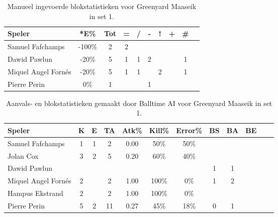 \begin{table}[ht!]
    \centering
    \scriptsize
    \begin{tabular}{|l|c|c|c|c|c|c|c|c|c|} \hline
        \textbf{Speler} & *E\% & Tot & = & / & - & ! & + & \# \\ \hline
        Samuel Fafchamps & -100\% & 2 & 2 &  &  &  &  & \\ 
        Dawid Pawlun & -20\% & 5 & 1 & 1 & 2 & & & 1 \\ 
        Miquel Angel Fornés & -20\% & 5 & 1 & 1 &  & 2 & & 1 \\
        Pierre Perin & 0\% & 1 &  &  & 1 &  &  &\\ \hline
    \end{tabular}
    \caption[Manueel ingevoerde blokstatistieken voor Greenyard Maaseik in set 1]{\label{tab:PL3BlockMaaseikMan1}Manueel ingevoerde blokstatistieken voor Greenyard Maaseik in set 1.}
\end{table}

\begin{table}[ht!]
  \centering
  \scriptsize
    \begin{tabular}{|l|c|c|c|c|c|c|c|c|c|c|c|} \hline
    \textbf{Speler} & K & E & TA & Atk\% & Kill\% & Error\% & BS & BA & BE \\ \hline
    Samuel Fafchamps & 1 & 1 & 2 & 0.00 & 50\% & 50\% &  &  &  \\
    Jolan Cox & 3 & 2 & 5 & 0.20 & 60\% & 40\% &   &  &  \\
    Dawid Pawlun &   &   &   &   &   &   & 1 & 1 & \\
    Miquel Angel Fornés & 2 &  & 2 & 1.00 & 100\% & 0\% & 1 & 2 & \\
    Hampus Ekstrand & 2 &  & 2 & 1.00 & 100\% & 0\% &  & & \\
    Pierre Perin & 5 & 2 & 11 & 0.27 & 45\% & 18\% & 0 & 1 & \\ \hline
  \end{tabular}
  \caption[Aanvals- en blokstatistieken gemaakt door Balltime AI voor Greenyard Maaseik in set 1]{\label{tab:PL3AttBlockMaaseikAI1}Aanvals- en blokstatistieken gemaakt door Balltime AI voor Greenyard Maaseik in set 1.}
\end{table}
